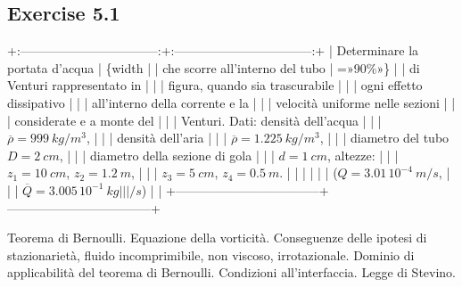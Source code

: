 \documentclass[letterpaper,10pt,italian]{jupyterBook}
\begin{document}
\subsection{Exercise 5.1}
\label{\detokenize{polimi/fluidmechanics-ita/template/capitoli/05_bernoulli/0503in:exercise-5-1}}\label{\detokenize{polimi/fluidmechanics-ita/template/capitoli/05_bernoulli/0503in:fluid-mechanics-bernoulli-ex-01}}\label{\detokenize{polimi/fluidmechanics-ita/template/capitoli/05_bernoulli/0503in::doc}}
\sphinxAtStartPar
+:———————————:+:———————————:+
| Determinare la portata d’acqua    | \{width |
| che scorre all’interno del tubo   | =»90\%»\}                           |
| di Venturi rappresentato in       |                                   |
| figura, quando sia trascurabile   |                                   |
| ogni effetto dissipativo          |                                   |
| all’interno della corrente e la   |                                   |
| velocità uniforme nelle sezioni   |                                   |
| considerate e a monte del         |                                   |
| Venturi. Dati: densità dell’acqua |                                   |
| \(\overline{\rho}= 999\ kg/m^3\),   |                                   |
| densità dell’aria                 |                                   |
| \(\overline{\rho}= 1.225\ kg/m^3\), |                                   |
| diametro del tubo \(D=2\  cm\),     |                                   |
| diametro della sezione di gola    |                                   |
| \(d=1\ cm\), altezze:               |                                   |
| \(z_1 = 10\ cm\), \(z_2 = 1.2\  m\),  |                                   |
| \(z_3 = 5\ cm\), \(z_4 = 0.5\ m\).    |                                   |
|                                   |                                   |
| (\(Q=3.01\, 10^{-4}\ m/s\),         |                                   |
| \(\overline{Q}=3.005\, 10^{-1}\ kg |                                   |
| /s\))                              |                                   |
+———————————–+———————————–+

\sphinxAtStartPar
Teorema di Bernoulli. Equazione della vorticità. Conseguenze delle
ipotesi di stazionarietà, fluido incomprimibile, non viscoso,
irrotazionale. Dominio di applicabilità del teorema di Bernoulli.
Condizioni all’interfaccia. Legge di Stevino.
\end{document}
